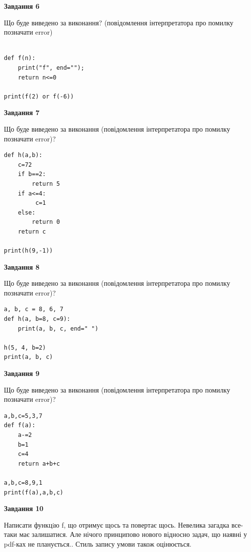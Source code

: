 \documentclass[12pt, ukrainian]{article}
\begin{document}
{\begin {large}
{\begin {center}\textbf{Завдання 6}\end {center}}

Що буде виведено за виконання? (повідомлення інтерпретатора про помилку позначати error)\par
\begin{verbatim}

def f(n):
    print("f", end="");
    return n<=0

print(f(2) or f(-6))
\end{verbatim}

{\begin {center}\textbf{Завдання 7}\end {center}}

Що буде виведено за виконання (повідомлення інтерпретатора про помилку позначати error)?\par
\begin{verbatim}
def h(a,b):
    c=72
    if b==2:
        return 5
    if a<=4:
         c=1
    else: 
        return 0
    return c

print(h(9,-1))
\end{verbatim}

{\begin {center}\textbf{Завдання 8}\end {center}}

Що буде виведено за виконання (повідомлення інтерпретатора про помилку позначати error)?\par
\begin{verbatim}
a, b, c = 8, 6, 7
def h(a, b=8, c=9):
    print(a, b, c, end=" ")

h(5, 4, b=2)
print(a, b, c)
\end{verbatim}

{\begin {center}\textbf{Завдання 9}\end {center}}

Що буде виведено за виконання (повідомлення інтерпретатора про помилку позначати error)?\par
\begin{verbatim}
a,b,c=5,3,7
def f(a):
    a-=2
    b=1
    c=4
    return a+b+c

a,b,c=8,9,1
print(f(a),a,b,c)
\end{verbatim}

{\begin {center}\textbf{Завдання 10}\end {center}}


Написати функцiю f, що отримує щось та повертає щось. Невелика загадка все-таки має залишатися. Але нічого принципово нового відносно задач, що наявні у pdf-ках не планується.. Стиль запису умови також оцінюється.\par
\end {large}}
\newpage

\end{document}
